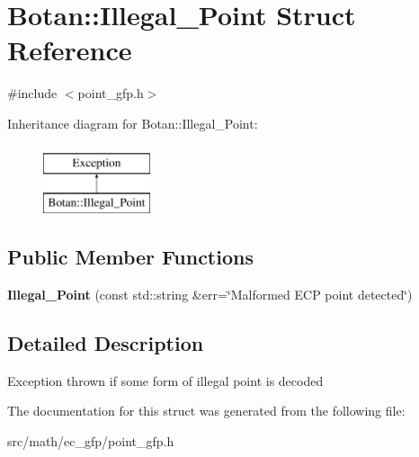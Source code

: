 \hypertarget{structBotan_1_1Illegal__Point}{\section{Botan\-:\-:Illegal\-\_\-\-Point Struct Reference}
\label{structBotan_1_1Illegal__Point}
}


{\ttfamily \#include $<$point\-\_\-gfp.\-h$>$}

Inheritance diagram for Botan\-:\-:Illegal\-\_\-\-Point\-:\begin{figure}[H]
\begin{center}
\leavevmode
\includegraphics[height=2.000000cm]{structBotan_1_1Illegal__Point}
\end{center}
\end{figure}
\subsection*{Public Member Functions}
\begin{DoxyCompactItemize}
\item 
\hypertarget{structBotan_1_1Illegal__Point_ae37c1df79208edbe22f91c555957e1f1}{{\bfseries Illegal\-\_\-\-Point} (const std\-::string \&err=\char`\"{}Malformed E\-C\-P point detected\char`\"{})}\label{structBotan_1_1Illegal__Point_ae37c1df79208edbe22f91c555957e1f1}

\end{DoxyCompactItemize}


\subsection{Detailed Description}
Exception thrown if some form of illegal point is decoded 

The documentation for this struct was generated from the following file\-:\begin{DoxyCompactItemize}
\item 
src/math/ec\-\_\-gfp/point\-\_\-gfp.\-h\end{DoxyCompactItemize}
